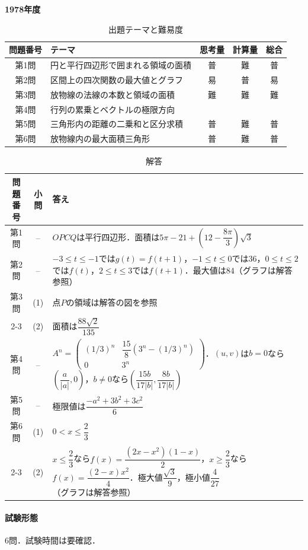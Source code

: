 \documentclass[../../main.tex]{subfiles}
\begin{document}
\begin{center}
  {\fontsize{48pt}{58pt}\selectfont \textbf{1978}\normalsize\textbf{年度}}
\end{center}

\begin{table}[htb]
  \centering
  \caption{出題テーマと難易度}
  \begin{tabular}{|c|p{6.2cm}|c|c|c|}
    \hline
    \textbf{問題番号} & \textbf{テーマ} & \textbf{思考量} & \textbf{計算量} & \textbf{総合} \\
    \hline
    第1問 & 円と平行四辺形で囲まれる領域の面積 & 普 & 難 & 普 \\
    \hline
    第2問 & 区間上の四次関数の最大値とグラフ & 易 & 普 & 易 \\
    \hline
    第3問 & 放物線の法線の本数と領域の面積 & 難 & 難 & 難 \\
    \hline
    第4問 & 行列の累乗とベクトルの極限方向 &  &  &  \\
    \hline
    第5問 & 三角形内の距離の二乗和と区分求積 & 普 & 難 & 普 \\
    \hline
    第6問 & 放物線内の最大面積三角形 & 普 & 難 & 普 \\
    \hline
  \end{tabular}
\end{table}

\begin{table}[htb]
  \centering
  \caption{解答}
  \renewcommand{\arraystretch}{1.4}
  \begin{tabular}{|c|c|p{9cm}|}
    \hline
    \textbf{問題番号} & \textbf{小問} & \textbf{答え} \\
    \hline
    第1問 & -- & $OPCQ$は平行四辺形．面積は$5\pi-21+\left(12-\dfrac{8\pi}{3}\right)\sqrt{3}$ \\
    \hline
    第2問 & -- & $-3\le t\le-1$では$g(t)=f(t+1)$，$-1\le t\le0$では$36$，$0\le t\le2$では$f(t)$，$2\le t\le3$では$f(t+1)$．最大値は$84$（グラフは解答参照） \\
    \hline
    第3問 & (1) & 点$P$の領域は解答の図を参照 \\
    \cline{2-3}
    & (2) & 面積は$\dfrac{88\sqrt{2}}{135}$ \\
    \hline
    第4問 & -- & $A^n=
    \begin{pmatrix}(1/3)^n & \dfrac{15}{8}(3^n-(1/3)^n)\\0&3^n
    \end{pmatrix}$．$(u,v)$は$b=0$なら$\left(\dfrac{a}{|a|},0\right)$，$b\ne0$なら$\left(\dfrac{15b}{17|b|},\dfrac{8b}{17|b|}\right)$ \\
    \hline
    第5問 & -- & 極限値は$\dfrac{-a^2+3b^2+3c^2}{6}$ \\
    \hline
    第6問 & (1) & $0<x\le\dfrac{2}{3}$ \\
    \cline{2-3}
    & (2) & $x\le\dfrac{2}{3}$なら$f(x)=\dfrac{(2x-x^2)(1-x)}{2}$，$x\ge\dfrac{2}{3}$なら$f(x)=\dfrac{(2-x)x^2}{4}$．極大値$\dfrac{\sqrt{3}}{9}$，極小値$\dfrac{4}{27}$（グラフは解答参照） \\
    \hline
  \end{tabular}
\end{table}

\paragraph{試験形態}
6問．試験時間は要確認．
\end{document}
